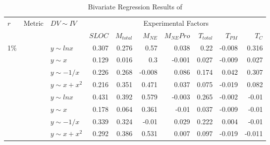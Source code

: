 \begin{table*}[!ht]\tiny
    \center
    \vspace*{-2mm}
    \caption{\label{eryuan} Bivariate Regression Results of \metricone{}}
    \begin{tabular}{| l | l | l | r | r | r | r | r | r | r | }
     \hline
    \multirow{2}{*}{$r$}&\multirow{2}{*}{Metric}&\multirow{2}{*}{$DV\sim IV$} & \multicolumn{7}{c|}{Experimental Factors}\\ \cline{4-10}
        && & $SLOC$ & $M_{total}$ & $M_{NE}$ & $M_{NE}Pro$ & $T_{total}$ & $T_{PM}$ & $T_C$ \\ \hline \hline


\multirow{16}{*}{1\%}

&\multirow{4}{*}{\metricone{}}
&$y\sim lnx$&\cellcolor[rgb]{.7,.7,.7}0.307&\cellcolor[rgb]{.7,.7,.7}0.276&\cellcolor[rgb]{.5,.5,.5}0.57&\cellcolor[rgb]{.9,.9,.9}0.038&\cellcolor[rgb]{.9,.9,.9}0.22&-0.008&\cellcolor[rgb]{.7,.7,.7}0.316  \\ \cline{3-10}
&&$y\sim x$&\cellcolor[rgb]{.9,.9,.9}0.129&\cellcolor[rgb]{.9,.9,.9}0.016&\cellcolor[rgb]{.7,.7,.7}0.3&-0.001&\cellcolor[rgb]{.9,.9,.9}0.027&-0.009&\cellcolor[rgb]{.9,.9,.9}0.027  \\ \cline{3-10}
&&$y\sim -1/x$&\cellcolor[rgb]{.9,.9,.9}0.226&\cellcolor[rgb]{.7,.7,.7}0.268&-0.008&\cellcolor[rgb]{.9,.9,.9}0.086&\cellcolor[rgb]{.9,.9,.9}0.174&\cellcolor[rgb]{.9,.9,.9}0.042&\cellcolor[rgb]{.7,.7,.7}0.307  \\ \cline{3-10}
&&$y\sim x+x^2$&\cellcolor[rgb]{.9,.9,.9}0.216&\cellcolor[rgb]{.7,.7,.7}0.351&\cellcolor[rgb]{.7,.7,.7}0.471&\cellcolor[rgb]{.9,.9,.9}0.037&\cellcolor[rgb]{.9,.9,.9}0.075&-0.019&\cellcolor[rgb]{.9,.9,.9}0.082  \\ \cline{2-10}

&\multirow{4}{*}{\metrictwor{}}
&$y\sim lnx$&\cellcolor[rgb]{.7,.7,.7}0.431&\cellcolor[rgb]{.7,.7,.7}0.392&\cellcolor[rgb]{.5,.5,.5}0.579&-0.003&\cellcolor[rgb]{.7,.7,.7}0.265&-0.002&-0.01  \\ \cline{3-10}
&&$y\sim x$&\cellcolor[rgb]{.9,.9,.9}0.178&\cellcolor[rgb]{.9,.9,.9}0.064&\cellcolor[rgb]{.7,.7,.7}0.361&-0.01&\cellcolor[rgb]{.9,.9,.9}0.037&-0.009&-0.01  \\ \cline{3-10}
&&$y\sim -1/x$&\cellcolor[rgb]{.7,.7,.7}0.339&\cellcolor[rgb]{.7,.7,.7}0.324&-0.01&\cellcolor[rgb]{.9,.9,.9}0.029&\cellcolor[rgb]{.9,.9,.9}0.222&\cellcolor[rgb]{.9,.9,.9}0.004&-0.01  \\ \cline{3-10}
&&$y\sim x+x^2$&\cellcolor[rgb]{.7,.7,.7}0.292&\cellcolor[rgb]{.7,.7,.7}0.386&\cellcolor[rgb]{.5,.5,.5}0.531&\cellcolor[rgb]{.9,.9,.9}0.007&\cellcolor[rgb]{.9,.9,.9}0.097&-0.019&-0.011  \\ \cline{2-10}


\end{tabular}
\end{table*}

